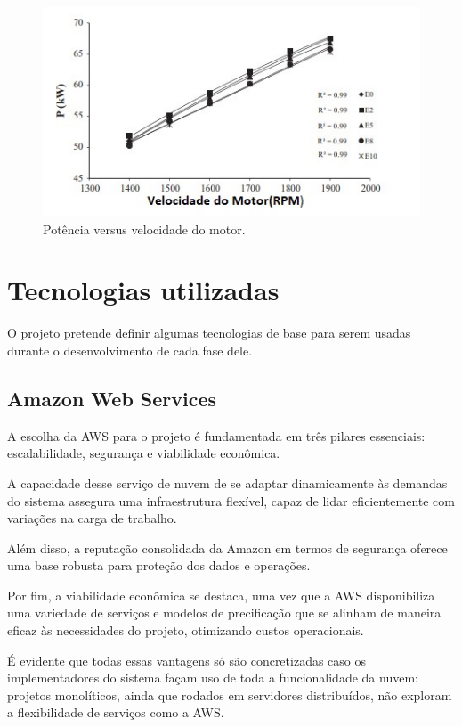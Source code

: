  \begin{figure}[hp]
    \centering
    
    \includegraphics[scale= 1]{figures/rpmxpotencia.jpeg}
    
    \caption{Potência versus velocidade do motor.}
    
    \label{fig:rpmxpotencia}
\end{figure}
 


\section{Tecnologias utilizadas}
O projeto pretende definir algumas tecnologias de base para serem usadas durante o desenvolvimento de cada fase dele.

    \subsection{Amazon Web Services}

    A escolha da AWS para o projeto é fundamentada em três pilares essenciais: escalabilidade, segurança e viabilidade econômica. 
    
    A capacidade desse serviço de nuvem de se adaptar dinamicamente às demandas do sistema assegura uma infraestrutura flexível, capaz de lidar eficientemente com variações na carga de trabalho. 
    
    Além disso, a reputação consolidada da Amazon em termos de segurança oferece uma base robusta para proteção dos dados e operações. 
    
    Por fim, a viabilidade econômica se destaca, uma vez que a AWS disponibiliza uma variedade de serviços e modelos de precificação que se alinham de maneira eficaz às necessidades do projeto, otimizando custos operacionais.

    É evidente que todas essas vantagens só são concretizadas caso os implementadores do sistema façam uso de toda a funcionalidade da nuvem: projetos monolíticos, ainda que rodados em servidores distribuídos, não exploram a flexibilidade de serviços como a AWS. 

